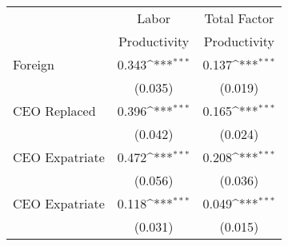 {
\def\sym#1{\ifmmode^{#1}\else\(^{#1}\)\fi}
\begin{tabular}{l*{2}{c}}
\hline\hline
                    &\multicolumn{1}{c}{Labor}&\multicolumn{1}{c}{Total Factor}\\
                    &\multicolumn{1}{c}{Productivity} &\multicolumn{1}{c}{Productivity} \\
\hline
Foreign             &       0.343\sym{***}&       0.137\sym{***}\\
                    &     (0.035)         &     (0.019)         \\
CEO Replaced        &       0.396\sym{***}&       0.165\sym{***}\\
                    &     (0.042)         &     (0.024)         \\
CEO Expatriate      &       0.472\sym{***}&       0.208\sym{***}\\
                    &     (0.056)         &     (0.036)         \\ \hline
CEO Expatriate      &       0.118\sym{***}&       0.049\sym{***}\\
                    &     (0.031)         &     (0.015)         \\
\hline\hline
\end{tabular}
}
